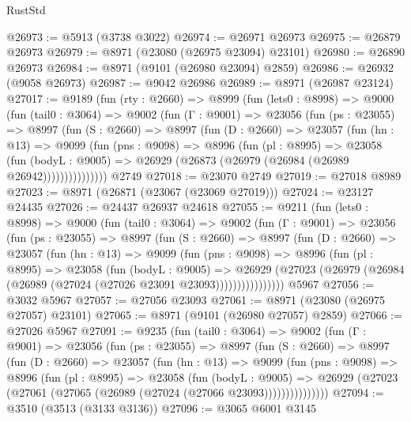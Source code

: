 \begin{lexlean}{RustStd}
\begin{coremodule}
@26973 := @5913 (@3738 @3022)
@26974 := @26971 @26973
@26975 := @26879 @26973
@26979 := @8971 (@23080 (@26975 @23094) @23101)
@26980 := @26890 @26973
@26984 := @8971 (@9101 (@26980 @23094) @2859)
@26986 := @26932 (@9058 @26973)
@26987 := @9042 @26986
@26989 := @8971 (@26987 @23124)
@27017 := @9189
    (fun (rty : @2660) =>
    @8999
      (fun (lets0 : @8998) =>
      @9000
        (fun (tail0 : @3064) =>
        @9002
          (fun (Γ : @9001) =>
          @23056
            (fun (ps : @23055) =>
            @8997
              (fun (S : @2660) =>
              @8997
                (fun (D : @2660) =>
                @23057
                  (fun (hn : @13) =>
                  @9099
                    (fun (pns : @9098) =>
                    @8996
                      (fun (pl : @8995) =>
                      @23058
                        (fun (bodyL : @9005) =>
                        @26929 (@26873 (@26979 (@26984 (@26989 @26942)))))))))))))))
    @2749
@27018 := @23070 @2749
@27019 := @27018 @8989
@27023 := @8971 (@26871 (@23067 (@23069 @27019)))
@27024 := @23127 @24435
@27026 := @24437 @26937 @24618
@27055 := @9211
    (fun (lets0 : @8998) =>
    @9000
      (fun (tail0 : @3064) =>
      @9002
        (fun (Γ : @9001) =>
        @23056
          (fun (ps : @23055) =>
          @8997
            (fun (S : @2660) =>
            @8997
              (fun (D : @2660) =>
              @23057
                (fun (hn : @13) =>
                @9099
                  (fun (pns : @9098) =>
                  @8996
                    (fun (pl : @8995) =>
                    @23058
                      (fun (bodyL : @9005) =>
                      @26929
                        (@27023
                          (@26979 (@26984 (@26989 (@27024 (@27026 @23091 @23093))))))))))))))))
    @5967
@27056 := @3032 @5967
@27057 := @27056 @23093
@27061 := @8971 (@23080 (@26975 @27057) @23101)
@27065 := @8971 (@9101 (@26980 @27057) @2859)
@27066 := @27026 @5967
@27091 := @9235
    (fun (tail0 : @3064) =>
    @9002
      (fun (Γ : @9001) =>
      @23056
        (fun (ps : @23055) =>
        @8997
          (fun (S : @2660) =>
          @8997
            (fun (D : @2660) =>
            @23057
              (fun (hn : @13) =>
              @9099
                (fun (pns : @9098) =>
                @8996
                  (fun (pl : @8995) =>
                  @23058
                    (fun (bodyL : @9005) =>
                    @26929 (@27023 (@27061 (@27065 (@26989 (@27024 (@27066 @23093)))))))))))))))
@27094 := @3510 (@3513 (@3133 @3136))
@27096 := @3065 @6001 @3145

\end{coremodule}
\end{lexlean}
